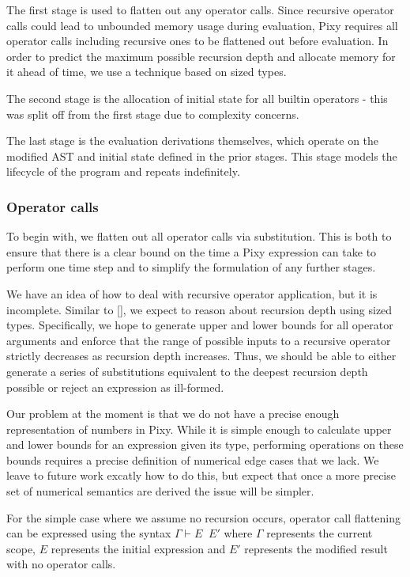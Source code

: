 \documentclass{scrartcl}
\DeclareMathOperator{\flattenrel}{\overset{flatten}{\Rightarrow}}
\begin{document}
    The first stage is used to flatten out any operator calls. Since recursive operator calls could lead to unbounded memory usage during evaluation, Pixy requires all operator calls including recursive ones to be flattened out before evaluation. In order to predict the maximum possible recursion depth and allocate memory for it ahead of time, we use a technique based on sized types.
    
    The second stage is the allocation of initial state for all builtin operators - this was split off from the first stage due to complexity concerns.
    
    The last stage is the evaluation derivations themselves, which operate on the modified AST and initial state defined in the prior stages. This stage models the lifecycle of the program and repeats indefinitely.
    
    \subsubsection{Operator calls}
    
    To begin with, we flatten out all operator calls via substitution. This is both to ensure that there is a clear bound on the time a Pixy expression can take to perform one time step and to simplify the formulation of any further stages.
    
    We have an idea of how to deal with recursive operator application, but it is incomplete. Similar to [], we expect to reason about recursion depth using sized types. Specifically, we hope to generate upper and lower bounds for all operator arguments and enforce that the range of possible inputs to a recursive operator strictly decreases as recursion depth increases. Thus, we should be able to either generate a series of substitutions equivalent to the deepest recursion depth possible or reject an expression as ill-formed.
    
    Our problem at the moment is that we do not have a precise enough representation of numbers in Pixy. While it is simple enough to calculate upper and lower bounds for an expression given its type, performing operations on these bounds requires a precise definition of numerical edge cases that we lack. We leave to future work excatly how to do this, but expect that once a more precise set of numerical semantics are derived the issue will be simpler.
    
    For the simple case where we assume no recursion occurs, operator call flattening can be expressed using the syntax $\Gamma \vdash E \flattenrel E'$ where $\Gamma$ represents the current scope, $E$ represents the initial expression and $E'$ represents the modified result with no operator calls.
    
\end{document}
